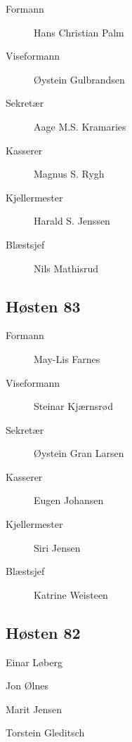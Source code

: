 {\begin{minipage}{0.6\textwidth}
\begin{description}
	\item[Formann]  Hans Christian Palm
	\item[Viseformann] Øystein Gulbrandsen
	\item[Sekretær] Aage M.S. Kramaries
	\item[Kasserer] Magnus S. Rygh
	\item[Kjellermester] Harald S. Jenssen
	\item[Blæstsjef] Nils Mathisrud
\end{description}
\subsection*{Høsten 83}

\begin{description}
	\item[Formann]  May-Lis Farnes
	\item[Viseformann] Steinar Kjærnsrød
	\item[Sekretær] Øystein Gran Larsen
	\item[Kasserer] Eugen Johansen
	\item[Kjellermester] Siri Jensen
	\item[Blæstsjef] Katrine Weisteen
\end{description}
\subsection*{Høsten 82}

\begin{description}
	\item Einar Løberg
	\item Jon Ølnes
	\item Marit Jensen
	\item Torstein Gleditsch
\end{description}
\end{minipage}
}



